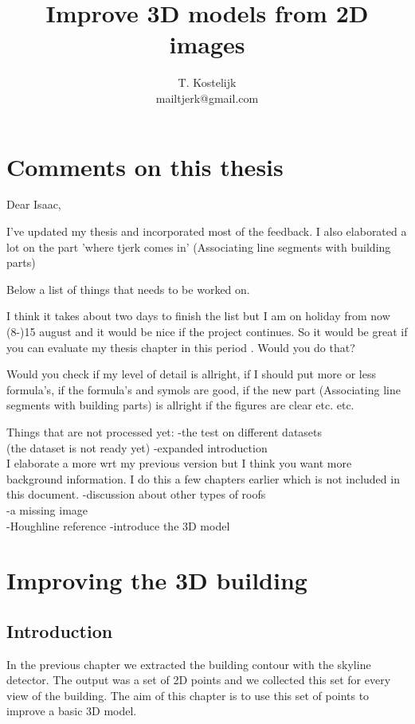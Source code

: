 \documentclass[10pt]{article}
\title{\sc Improve 3D models from 2D images}
\author{T. Kostelijk\\mailtjerk@gmail.com}
\begin{document}
\maketitle




\section{Comments on this thesis}
Dear Isaac,

I've updated my thesis and incorporated most of the feedback.
I also elaborated a lot on the part 'where tjerk comes in' (Associating line segments with building parts)

Below a list of things that needs to be worked on.

I think it takes about two days to finish the list but I am on holiday from
now (8-)15 august and it would be nice if the project continues. So it would
be great if you can evaluate my thesis chapter in this period . Would you do that?

Would you check if my level of detail is allright,
if I should put more or less formula's,
if the formula's and symols are good,
if the new part (Associating line segments with building parts) is allright
if the figures are clear
etc. etc.

Things that are not processed yet:
-the test on different datasets\\
(the dataset is not ready yet)
-expanded introduction\\
I elaborate a more wrt my previous version but I think you want more background information.
I do this a few chapters earlier which is not included in this document.
-discussion about other types of roofs\\
-a missing image\\
-Houghline reference
-introduce the 3D model\\


\section{Improving the 3D building}
\subsection{Introduction}
In the previous chapter we extracted the building contour with the skyline
detector. The output was a set of 2D points and we collected this set for every
view of the building.  The aim of this chapter is to use this set of points to
improve a basic 3D model.
\end{document}
